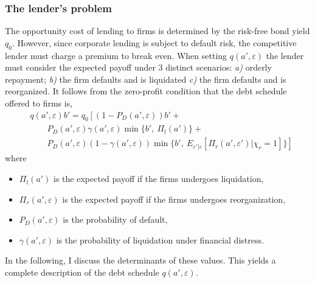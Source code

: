 \documentclass[12pt]{article}
\begin{document}
\subsubsection{The lender's problem}    \label{sec: The lender's problem}
The opportunity cost of lending to firms is determined by the risk-free bond yield $q_0$. However, since corporate lending is subject to default risk, the competitive lender must charge a premium to break even. When setting $q(a',\varepsilon)$ the lender must consider the expected payoff under 3 distinct scenarios: \textit{a)} orderly repayment; \textit{b)} the firm defaults and is liquidated \textit{c)} the firm defaults and is reorganized. It follows from the zero-profit condition that the debt schedule offered to firms is, 
\begin{equation} \label{eq:q}
    \begin{split}
        & q(a', \varepsilon)b' = q_0 \left[ \left(1-P_D(a', \varepsilon)\right)b' + \right. \\
        & \qquad P_D(a', \varepsilon) \gamma(a', \varepsilon) \min \{b', \ \Pi_{l}(a')\} + \\ 
        & \qquad \left. P_D(a', \varepsilon) (1-\gamma(a', \varepsilon))\min \{b', \ E_{\varepsilon' | \varepsilon} [ \Pi_{r}(a', \varepsilon') |\chi_r = 1 ] \} \right]
    \end{split}
\end{equation}
where 
\begin{itemize}\setlength\itemsep{0em} 
    \item $\Pi_{l}(a')$ is the expected payoff if the firms undergoes liquidation,
    \item $\Pi_{r}(a', \varepsilon)$ is the expected payoff if the firms undergoes reorganization,
    \item $P_D(a', \varepsilon)$ is the probability of default,
    \item $\gamma(a', \varepsilon)$ is the probability of liquidation under financial distress. 
\end{itemize} 
In the following, I discuss the determinants of these values. This yields a complete description of the debt schedule $q(a', \varepsilon)$.
\end{document}
